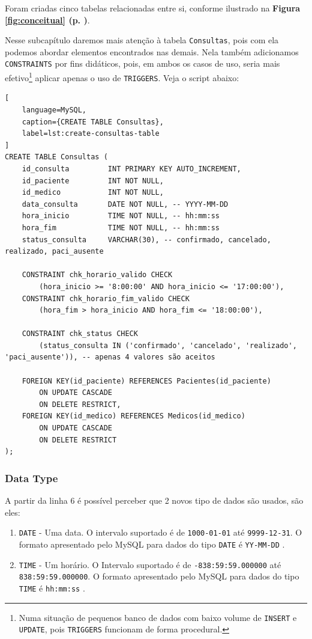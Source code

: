 
Foram criadas cinco tabelas relacionadas entre si, conforme ilustrado na \textbf{Figura \ref{fig:conceitual} (p. \pageref{fig:conceitual})}.

Nesse subcapítulo daremos mais atenção à tabela \texttt{Consultas}, pois com ela podemos abordar elementos encontrados nas demais. Nela também adicionamos \texttt{CONSTRAINTS} por fins didáticos, pois, em ambos os casos de uso, seria mais efetivo\footnote{Numa situação de pequenos banco de dados com baixo volume de \texttt{INSERT} e \texttt{UPDATE}, pois \texttt{TRIGGERS} funcionam de forma procedural\cite{TRIGGER_PROC}.} aplicar apenas o uso de \texttt{TRIGGERS}. Veja o script abaixo:

\begin{lstlisting}[
    language=MySQL,
    caption={CREATE TABLE Consultas},
    label=lst:create-consultas-table
]
CREATE TABLE Consultas (
    id_consulta         INT PRIMARY KEY AUTO_INCREMENT,
    id_paciente         INT NOT NULL, 
    id_medico           INT NOT NULL,
    data_consulta       DATE NOT NULL, -- YYYY-MM-DD
    hora_inicio         TIME NOT NULL, -- hh:mm:ss
    hora_fim            TIME NOT NULL, -- hh:mm:ss
    status_consulta     VARCHAR(30), -- confirmado, cancelado, realizado, paci_ausente             

    CONSTRAINT chk_horario_valido CHECK 
        (hora_inicio >= '8:00:00' AND hora_inicio <= '17:00:00'),
    CONSTRAINT chk_horario_fim_valido CHECK 
        (hora_fim > hora_inicio AND hora_fim <= '18:00:00'),

    CONSTRAINT chk_status CHECK 
        (status_consulta IN ('confirmado', 'cancelado', 'realizado', 'paci_ausente')), -- apenas 4 valores são aceitos

    FOREIGN KEY(id_paciente) REFERENCES Pacientes(id_paciente) 
        ON UPDATE CASCADE 
        ON DELETE RESTRICT,
    FOREIGN KEY(id_medico) REFERENCES Medicos(id_medico) 
        ON UPDATE CASCADE 
        ON DELETE RESTRICT
);
\end{lstlisting}
\noindent

\subsubsection{Data Type} %

A partir da linha 6 é possível perceber que 2 novos tipo de dados são usados, são eles:

\begin{enumerate}
    \item \texttt{DATE} - Uma data. O intervalo suportado é de \texttt{1000-01-01} até \texttt{9999-12-31}. O formato apresentado pelo MySQL para dados do tipo \texttt{DATE} é \texttt{YY-MM-DD} \cite{MySQL_DATE}.
    \item \texttt{TIME} - Um horário. O Intervalo suportado é de \texttt{-838:59:59.000000} até \texttt{838:59:59.000000}. O formato apresentado pelo MySQL para dados do tipo \texttt{TIME} é \texttt{hh:mm:ss} \cite{MySQL_DATE}.
\end{enumerate}

